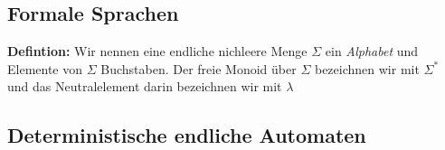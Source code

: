 \documentclass[a4paper, halfparskip*]{scrartcl}
\begin{document}
\subsection{Formale Sprachen}
\label{sec:tg:fs}

\textbf{Defintion:} Wir nennen eine endliche nichleere Menge $\Sigma$ ein
\emph{Alphabet} und Elemente von $\Sigma$ Buchstaben. Der freie Monoid über
$\Sigma$ bezeichnen wir mit $\Sigma^*$ und das Neutralelement darin bezeichnen
wir mit $\lambda$


\subsection{Deterministische endliche Automaten}
\label{sec:tg:dfa}


\end{document}
